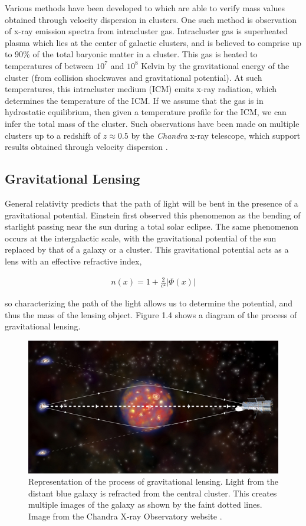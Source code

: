 \documentclass{report}
\begin{document}
Various methods have been developed to which are able to verify mass values obtained through velocity dispersion in clusters. One such method is observation of x-ray emission spectra from intracluster gas. Intracluster gas is superheated plasma which lies at the center of galactic clusters, and is believed to comprise up to 90\% of the total baryonic matter in a cluster. This gas is heated to temperatures of between $10^7$ and $10^8$ Kelvin by the gravitational energy of the cluster (from collision shockwaves and gravitational potential). At such temperatures, this intracluster medium (ICM) emits x-ray radiation, which determines the temperature of the ICM. If we assume that the gas is in hydrostatic equilibrium, then given a temperature profile for the ICM, we can infer the total mass of the cluster. Such observations have been made on multiple clusters up to a redshift of $z \approx 0.5$ by the \emph{Chandra} x-ray telescope, which support results obtained through velocity dispersion \cite{Vikhlinin2005,Vikhlinin2009}.

\subsection{Gravitational Lensing}

General relativity predicts that the path of light will be bent in the presence of a gravitational potential. Einstein first observed this phenomenon as the bending of starlight passing near the sun during a total solar eclipse. The same phenomenon occurs at the intergalactic scale, with the gravitational potential of the sun replaced by that of a galaxy or a cluster. This gravitational potential acts as a lens with an effective refractive index,

\begin{eqnarray}
n(x) = 1 + \frac{2}{c^2}|\Phi(x)|
\end{eqnarray}

so characterizing the path of the light allows us to determine the potential, and thus the mass of the lensing object. Figure 1.4 shows a diagram of the process of gravitational lensing.

\begin{figure}[h]
\centering
\includegraphics[width = .4\textwidth]{Lens_diagram.jpg}
\caption{Representation of the process of gravitational lensing. Light from the distant blue galaxy is refracted from the central cluster. This creates multiple images of the galaxy as shown by the faint dotted lines. Image from the Chandra X-ray Observatory website \cite{lens}.}
\end{figure}
\end{document}
